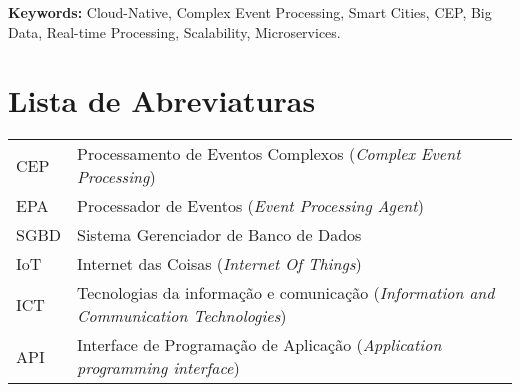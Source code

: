 \documentclass[11pt,twoside,a4paper]{book}
\begin{document}

\noindent \textbf{Keywords:} Cloud-Native, Complex Event Processing, Smart Cities, CEP, Big Data, Real-time Processing, Scalability, Microservices.

\tableofcontents    %

\chapter{Lista de Abreviaturas}
\begin{tabular}{ll}
         CEP         & Processamento de Eventos Complexos (\emph{Complex Event Processing})\\
         EPA         & Processador de Eventos (\emph{Event Processing Agent})\\
         SGBD        & Sistema Gerenciador de Banco de Dados \\
         IoT         & Internet das Coisas (\emph{Internet Of Things})\\
         ICT         & Tecnologias da informação e comunicação (\emph{Information and Communication Technologies})\\
         API		 & Interface de Programação de Aplicação (\emph{Application programming interface})
\end{tabular}


\listoffigures            
\listoftables            

\mainmatter
\end{document}
